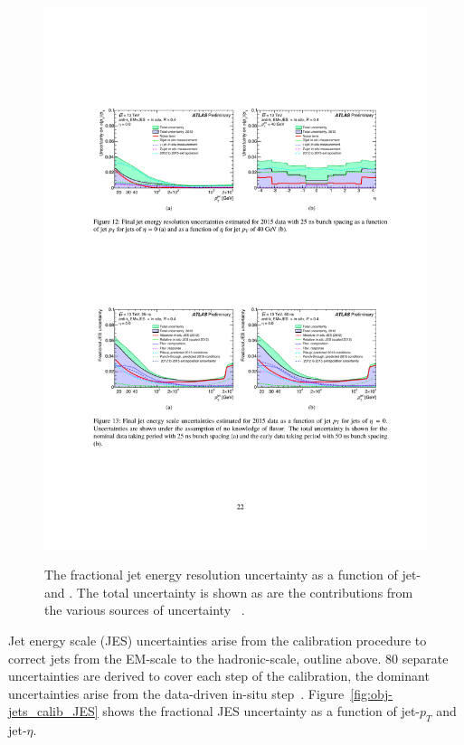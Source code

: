 \begin{figure}[!ht]
  \begin{center}
    \captionsetup[subfigure]{aboveskip=0pt,justification=centering}
     {\includegraphics[width=0.45\linewidth, angle=0]{figs/Objects/jets_uncert_JER_pt.pdf} }
  \end{center}
  \caption[The fractional jet energy resolution uncertainty as a function of jet-\pT and \eta.
    The total uncertainty is shown as are the contributions from the various sources of uncertainty.]
          {The fractional jet energy resolution uncertainty as a function of jet-\pT and \eta.
            The total uncertainty is shown as are the contributions from the various sources of uncertainty ~\cite{obj-jets_calib_2015}.}
  \label{fig:obj-jets_calib_JER}
\end{figure}
\FloatBarrier
Jet energy scale (JES) uncertainties arise from the calibration procedure
to correct jets from the EM-scale to the hadronic-scale, outline above.
80 separate uncertainties are derived to cover each step of the calibration,
the dominant uncertainties arise from the data-driven in-situ step~\cite{obj-jets_calib_run2}.
Figure~\ref{fig:obj-jets_calib_JES} shows the fractional JES uncertainty as a function of jet-$p_T$ and jet-$\eta$.

